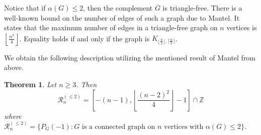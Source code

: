 \documentclass[12pt]{amsart}
\theoremstyle{plain}
\newtheorem{thm}{Theorem}[section]
\theoremstyle{definition}
\begin{document}
\begin{remark}
   Notice that if $\alpha(G)\le 2$, then the complement $\overline{G}$ is triangle-free. There is a well-known bound on the number of edges of such a graph due to Mantel. It states that the maximum number of edges in a triangle-free graph  on $n$
vertices is  $\left\lfloor \frac{n^2}{4}\right\rfloor$.  Equality holds if and only if the graph is $ K_{\lfloor \frac{n}{2}\rfloor,\lceil \frac{n}{2}\rceil}$.
\end{remark}

We obtain the following description utilizing the mentioned result of Mantel from above.

\begin{thm}\label{thm:alpha2_range}
Let \(n\geq 3\). Then
\[
\mathcal R_n^{(\leq 2)}
=
\left[
-(n-1),
\left\lfloor \frac{(n-2)^2}{4}\right\rfloor-1
\right]\cap \mathbb Z
\]
where \(\mathcal R_n^{(\leq 2)}
=
\{ P_G(-1): G \text{ is a connected graph on } n \text{ vertices with } \alpha(G)\leq 2 \}\).
\end{thm}
\end{document}
